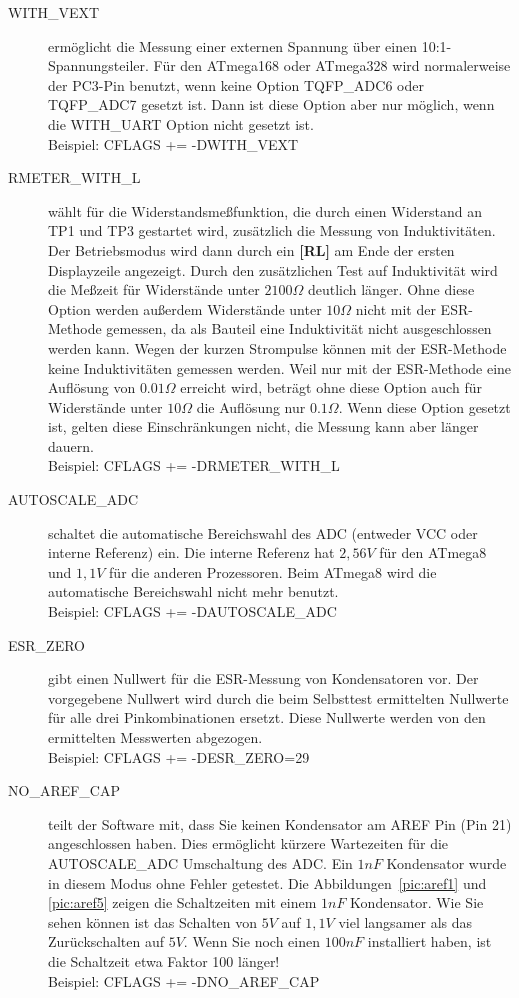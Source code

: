 \begin{description}
  \item[WITH\_VEXT] ermöglicht die Messung einer externen Spannung über einen 10:1-Spannungsteiler.
Für den ATmega168 oder ATmega328 wird normalerweise der PC3-Pin benutzt, wenn keine Option TQFP\_ADC6 oder
TQFP\_ADC7 gesetzt ist. Dann ist diese Option aber nur möglich, wenn die WITH\_UART Option nicht gesetzt ist.\\
Beispiel: CFLAGS += -DWITH\_VEXT 

  \item[RMETER\_WITH\_L] wählt für die Widerstandsmeßfunktion, die durch einen Widerstand an TP1 und TP3 gestartet wird,
zusätzlich die Messung von Induktivitäten. Der Betriebsmodus wird dann durch ein {\bf[RL]} am Ende der ersten Displayzeile
angezeigt. Durch den zusätzlichen Test auf Induktivität wird die Meßzeit für Widerstände unter \(2100\Omega\) deutlich
länger. Ohne diese Option werden außerdem Widerstände unter \(10\Omega\) nicht mit der ESR-Methode gemessen,
da als Bauteil eine Induktivität nicht ausgeschlossen werden kann.
Wegen der kurzen Strompulse können mit der ESR-Methode keine Induktivitäten gemessen werden.
Weil nur mit der ESR-Methode eine Auflösung von \(0.01\Omega\) erreicht wird, beträgt ohne diese Option auch für 
Widerstände unter \(10\Omega\) die Auflösung nur \(0.1\Omega\).
Wenn diese Option gesetzt ist, gelten diese Einschränkungen nicht, die Messung kann aber länger dauern.\\
Beispiel: CFLAGS += -DRMETER\_WITH\_L

  \item[AUTOSCALE\_ADC] schaltet die automatische Bereichswahl des ADC (entweder VCC oder interne Referenz) ein.
Die interne Referenz hat \(2,56V\) für den ATmega8 und \(1,1V\) für die anderen Prozessoren.
Beim ATmega8 wird die automatische Bereichswahl nicht mehr benutzt.\\
Beispiel: CFLAGS += -DAUTOSCALE\_ADC

  \item[ESR\_ZERO] gibt einen Nullwert für die ESR-Messung von Kondensatoren vor.
Der vorgegebene Nullwert wird durch die beim Selbsttest ermittelten Nullwerte für alle drei Pinkombinationen ersetzt.
 Diese Nullwerte werden von den ermittelten Messwerten abgezogen.\\
Beispiel: CFLAGS += -DESR\_ZERO=29

  \item[NO\_AREF\_CAP] teilt der Software mit, dass Sie keinen Kondensator am AREF Pin (Pin 21) angeschlossen haben.
Dies ermöglicht kürzere Wartezeiten für die AUTOSCALE\_ADC Umschaltung des ADC.
Ein \(1nF\) Kondensator wurde in diesem Modus ohne Fehler getestet.
Die Abbildungen~\ref{pic:aref1} und \ref{pic:aref5} zeigen die Schaltzeiten mit einem \(1nF\) Kondensator.
Wie Sie sehen können ist das Schalten von \(5V\) auf \(1,1V\) viel langsamer als das Zurückschalten auf \(5V\).
Wenn Sie noch einen \(100nF\) installiert haben, ist die Schaltzeit etwa Faktor 100 länger!\\
Beispiel: CFLAGS += -DNO\_AREF\_CAP

\end{description}

